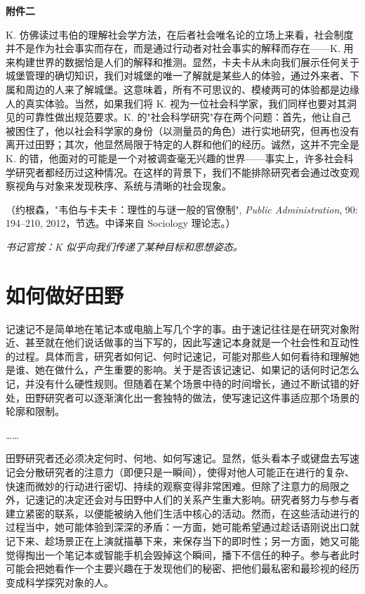 \documentclass[12pt,a4paper]{article}
\newcommand{\clerknote}[1]{%
  \vspace{1.2em}%
  {\kaishu\small\textit{书记官按：#1}}%
}
\newcommand{\sourcenote}[1]{%
  \par\vspace{0.5em}%
  {\footnotesize\color{gray}（#1）}%
}
\begin{document}
\vspace{1.5em}
{\large\bfseries 附件二}


K. 仿佛读过韦伯的理解社会学方法，在后者社会唯名论的立场上来看，社会制度并不是作为社会事实而存在，而是通过行动者对社会事实的解释而存在——K. 用来构建世界的数据恰是人们的解释和推测。显然，卡夫卡从未向我们展示任何关于城堡管理的确切知识，我们对城堡的唯一了解就是某些人的体验，通过外来者、下属和周边的人来了解城堡。这意味着，所有不可思议的、模棱两可的体验都是边缘人的真实体验。当然，如果我们将 K. 视为一位社会科学家，我们同样也要对其洞见的可靠性做出规范要求。K. 的"社会科学研究"存在两个问题：首先，他让自己被困住了，他以社会科学家的身份（以测量员的角色）进行实地研究，但再也没有离开过田野；其次，他显然局限于特定的人群和他们的经历。诚然，这并不完全是 K. 的错，他面对的可能是一个对被调查毫无兴趣的世界——事实上，许多社会科学研究者都经历过这种情况。在这样的背景下，我们不能排除研究者会通过改变观察视角与对象来发现秩序、系统与清晰的社会现象。
\sourcenote{约根森，"韦伯与卡夫卡：理性的与谜一般的官僚制", \textit{Public Administration}, 90: 194--210, 2012，节选。中译来自 Sociology 理论志。}

\clerknote{K 似乎向我们传递了某种目标和思想姿态。}

\newpage

\section{如何做好田野}

记速记不是简单地在笔记本或电脑上写几个字的事。由于速记往往是在研究对象附近、甚至就在他们说话做事的当下写的，因此写速记本身就是一个社会性和互动性的过程。具体而言，研究者如何记、何时记速记，可能对那些人如何看待和理解她是谁、她在做什么，产生重要的影响。关于是否该记速记、如果记的话何时记怎么记，并没有什么硬性规则。但随着在某个场景中待的时间增长，通过不断试错的好处，田野研究者可以逐渐演化出一套独特的做法，使写速记这件事适应那个场景的轮廓和限制。

……

田野研究者还必须决定何时、何地、如何写速记。显然，低头看本子或键盘去写速记会分散研究者的注意力（即便只是一瞬间），使得对他人可能正在进行的复杂、快速而微妙的行动进行密切、持续的观察变得非常困难。但除了注意力的局限之外，记速记的决定还会对与田野中人们的关系产生重大影响。研究者努力与参与者建立紧密的联系，以便能被纳入他们生活中核心的活动。然而，在这些活动进行的过程当中，她可能体验到深深的矛盾：一方面，她可能希望通过趁话语刚说出口就记下来、趁场景正在上演就描摹下来，来保存当下的即时性；另一方面，她又可能觉得掏出一个笔记本或智能手机会毁掉这个瞬间，播下不信任的种子。参与者此时可能会把她看作一个主要兴趣在于发现他们的秘密、把他们最私密和最珍视的经历变成科学探究对象的人。
\end{document}
